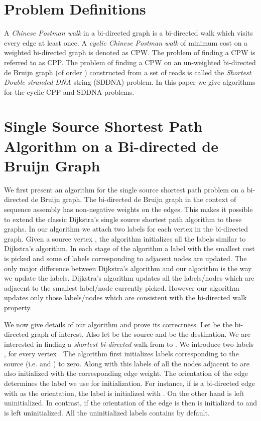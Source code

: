 \documentclass[runningheads]{llncs}
\begin{document}
\section{Problem Definitions}
\label{sec:prob-def}
A {\em Chinese Postman walk} in a bi-directed graph is a bi-directed walk which visits every 
edge at least once. A {\em cyclic Chinese Postman walk} of minimum cost on a weighted bi-directed graph is denoted as CPW. The problem of finding a CPW is referred to as CPP. The problem of finding a CPW on an un-weighted 
bi-directed de Bruijn graph (of order ) constructed from a set of reads is called the
{\em Shortest Double stranded DNA} string (SDDNA) problem.  In this paper we give algorithms for the cyclic CPP and SDDNA problems.

\section{Single Source Shortest Path Algorithm on a Bi-directed de Bruijn Graph}
\label{sec:bi-short-path}
We first present an algorithm for the single source shortest path problem on a 
bi-directed de Bruijn graph. The bi-directed de Bruijn graph in the context of 
sequence assembly has non-negative weights on the edges. This makes it possible to 
extend the classic Dijkstra's single source shortest path algorithm to these
graphs. In our algorithm we attach two labels for each vertex in the bi-directed 
graph. Given a source vertex , the algorithm initializes all the labels
similar to Dijkstra's algorithm. In each stage of the algorithm a label with 
the smallest cost is picked and some of labels corresponding to adjacent
nodes are updated. The only major difference between Dijkstra's algorithm 
and our algorithm is the way we update the labels. Dijkstra's algorithm 
updates all the labels/nodes which are adjacent to the smallest label/node
currently picked. However our algorithm updates only those labels/nodes which
are consistent with the bi-directed walk property.  

We now give details of our algorithm and prove its correctness. Let 
 be the bi-directed graph of interest. Also let  be the source 
and  be the destination. We are interested in finding a {\em shortest 
bi-directed} walk from  to . We introduce two labels , 
 for every vertex . The algorithm first initializes
labels corresponding to the source (i.e.  and ) 
to zero. Along with this labels of all the nodes adjacent to  are
also initialized with the corresponding edge weight. The orientation
of the edge determines the label we use for initialization. For instance,
if  is a bi-directed edge with  as the orientation,
the label  is initialized with . On the 
other hand  is left uninitialized. In contrast, if
the orientation of the edge is  then  is initialized
to  and  is left uninitialized. All the uninitialized 
labels contains  by default. 
\end{document}
